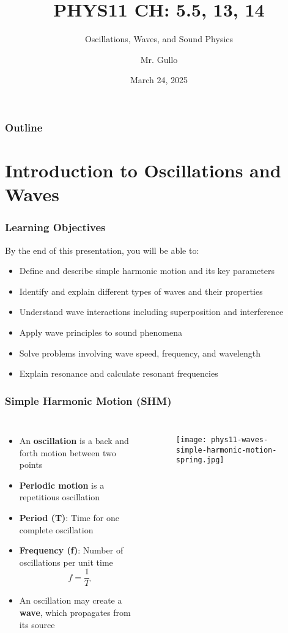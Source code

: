 \documentclass{beamer}
\title[Waves \& Sound]{PHYS11 CH: 5.5, 13, 14}
\subtitle{Oscillations, Waves, and Sound Physics}
\author[Mr. Gullo]{Mr. Gullo}
\date[Mar 2025]{March 24, 2025}
\institute{Physics Department}
\begin{document}
\frame{\titlepage}

\begin{frame}
\frametitle{Outline}
\tableofcontents
\end{frame}

\section{Introduction to Oscillations and Waves}

\begin{frame}
\frametitle{Learning Objectives}
By the end of this presentation, you will be able to:
\begin{itemize}
\item Define and describe simple harmonic motion and its key parameters
\item Identify and explain different types of waves and their properties
\item Understand wave interactions including superposition and interference
\item Apply wave principles to sound phenomena
\item Solve problems involving wave speed, frequency, and wavelength
\item Explain resonance and calculate resonant frequencies
\end{itemize}
\end{frame}

\begin{frame}
\frametitle{Simple Harmonic Motion (SHM)}
\begin{columns}
\begin{itemize}
\item An \textbf{oscillation} is a back and forth motion between two points
\item \textbf{Periodic motion} is a repetitious oscillation
\item \textbf{Period (T)}: Time for one complete oscillation
\item \textbf{Frequency (f)}: Number of oscillations per unit time
\begin{equation}
f = \frac{1}{T}
\end{equation}
\item An oscillation may create a \textbf{wave}, which propagates from its source
\end{itemize}

\begin{figure}
    \centering
    \texttt{[image: phys11-waves-simple-harmonic-motion-spring.jpg]}
\end{figure}
\end{columns}
\end{frame}
\end{document}
